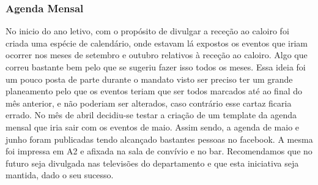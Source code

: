 
\subsubsection{Agenda Mensal}

No inicio do ano letivo, com o propósito de divulgar a receção ao caloiro foi criada uma espécie de calendário, onde estavam lá expostos os eventos que iriam ocorrer nos meses de setembro e outubro relativos à receção ao caloiro. Algo que correu bastante bem pelo que se sugeriu fazer isso todos os meses. Essa ideia foi um pouco posta de parte durante o mandato visto ser preciso ter um grande planeamento pelo que os eventos teriam que ser todos marcados até ao final do mês anterior, e não poderiam ser alterados, caso contrário esse cartaz ficaria errado. No mês de abril decidiu-se testar a criação de um template da agenda mensal que iria sair com os eventos de maio. Assim sendo, a agenda de maio e junho foram publicadas tendo alcançado bastantes pessoas no facebook. A mesma foi impressa em A2 e afixada na sala de convívio e no bar. Recomendamos que no futuro seja divulgada nas televisões do departamento e que esta iniciativa seja mantida, dado o seu sucesso.